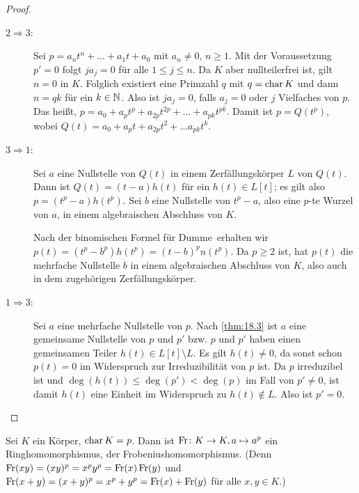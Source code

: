 \documentclass[12pt,a4paper]{scrartcl}
\begin{document}
\begin{proof}
	\leavevmode
	\begin{description}
		\item[\glqq$2\Rightarrow3$\grqq:] Sei $p = a_nt^n+\dots +a_1t+a_0$ mit $a_n \neq 0$, $n\geq 1$. Mit der Voraussetzung $p' = 0$ folgt $ja_j = 0$ für alle $1\leq j\leq n$. Da $K$ aber nullteilerfrei ist, gilt $n = 0$ in $K$. Folglich existiert eine Primzahl $q$ mit $q = \operatorname{char} K$ und dann $n = qk$ für ein $k\in\mathbb N$. Also ist $ja_j = 0$, falls $a_j = 0$ oder $j$ Vielfaches von $p$. Das heißt, $p = a_0+a_pt^p+a_{2p}t^{2p}+\dots+a_{pk}t^{pk}$. Damit ist $p = Q(t^p)$, wobei $Q(t)= a_0+a_pt+a_{2p}t^2+\dots a_{pk}t^k$.
		\item[\glqq$3\Rightarrow1$\grqq:] Sei $a$ eine Nullstelle von $Q(t)$ in einem Zerfällungskörper $L$ von $Q(t)$. Dann ist $Q(t) = (t-a)h(t)$ für ein $h(t)\in L[t]$; es gilt also $p = (t^p-a)h(t^p)$. Sei $b$ eine Nullstelle von $t^p-a$, also eine $p$-te Wurzel von $a$, in einem algebraischen Abschluss von $K$. 
		
		Nach der binomischen Formel \glqq für Dumme\grqq\ erhalten wir $p(t) = (t^p-b^p)h(t^p) = (t-b)^pn(t^p)$. Da $p\geq 2$ ist, hat $p(t)$ die mehrfache Nullstelle $b$ in einem algebraischen Abschluss von $K$, also auch in dem zugehörigen Zerfällungskörper.
		\item[\glqq$1\Rightarrow3$\grqq:] Sei $a$ eine mehrfache Nullstelle von $p$. Nach \cref{thm:18.3} ist $a$ eine gemeinsame  Nullstelle von $p$ und $p'$ bzw. $p$ und $p'$ haben einen gemeinsamen Teiler $h(t)\in L[t]\setminus L$. Es gilt $h(t)\neq 0$, da sonst schon $p(t) = 0$ im Widerspruch zur Irreduzibilität von $p$ ist. Da $p$ irreduzibel ist und $\deg(h(t)) \leq \deg(p')<\deg(p)$ im Fall von $p' \neq 0$, ist damit $h(t)$ eine Einheit im Widerspruch zu $h(t) \notin L$. Also ist $p' = 0$.
	\end{description}
\end{proof}

\begin{defi}
	Sei $K$ ein Körper, $\operatorname{char} K = p$. Dann ist $\operatorname{Fr}\colon K\to K, a\mapsto a^p$ ein Ringhomomorphismus, der Frobeniushomomorphismus. (Denn $\operatorname{Fr}(xy) = (xy)^p = x^py^p = \operatorname{Fr}(x)\operatorname{Fr}(y)$ und $\operatorname{Fr}(x+y) = (x+y)^p = x^p+y^p = \operatorname{Fr}(x) + \operatorname{Fr}(y)$ für alle $x,y\in K$.)
\end{defi}
\end{document}
